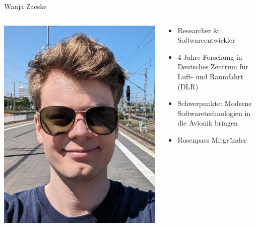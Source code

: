 \begin{frame}{Wanja Zaeske}
  \begin{columns}[fullwidth,c]
    \begin{column}{.3\linewidth}
      \includegraphics[width=.92\linewidth]{graphics/wanja-zaeske.png}
    \end{column}
    \begin{column}{.7\linewidth}
      \begin{itemize}
        \item Researcher \& Softwareentwickler
        \item 4 Jahre Forschung in Deutsches Zentrum für Luft- und Raumfahrt (DLR)
        \item Schwerpunkte: Moderne Softwaretechnologien in die Avionik bringen
        \item Rosenpass Mitgründer
      \end{itemize}
    \end{column}%
  \end{columns}
\end{frame}

